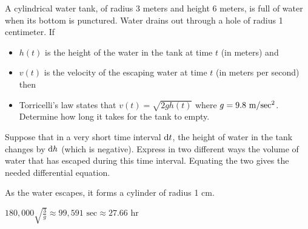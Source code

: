 
\begin{Mquestion}[M121 2001A]
A cylindrical water tank, of radius 3 meters and height 6 meters,
is full of water when its bottom is punctured. Water drains out
through a hole of radius 1 centimeter. If
\begin{itemize}\itemsep1pt \parskip0pt  %
\item
$h(t)$ is the height of the water in the tank at time $t$ (in
meters) and
\item
$v(t)$ is the velocity of the escaping water  at time $t$ (in
meters per second) then
\item
Torricelli's law states that $v(t)=\sqrt{2gh(t)}$ where $g=9.8\
{\rm m/sec^2}$. Determine how long it takes for the tank to empty.
\end{itemize}
\end{Mquestion}

\begin{hint}
Suppose that in a very short time interval $\mathrm{d}t$, the height
of water in the tank changes by $\mathrm{d}h$ (which is negative).
Express in two different ways the volume of water that has escaped
during this time interval. Equating the two gives the needed differential
equation.

As the water escapes, it forms a cylinder of radius 1 cm.
\end{hint}

\begin{answer}
$180,000 \sqrt{\frac{3}{g}}\approx 99,591\text{ sec}
                           \approx 27.66\text{ hr}$
\end{answer}

